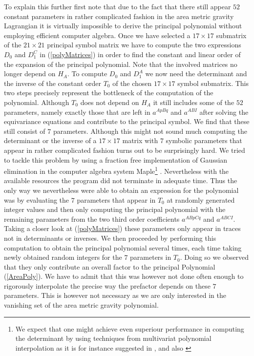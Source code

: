 \documentclass[a4paper,12pt, DIV=14, BCOR=5mm, twoside, headsepline]{scrbook}
\begin{document}
To explain this further first note that due to the fact that there still appear $52$ constant parameters in rather complicated fashion in the area metric gravity Lagrangian it is virtually impossible to derive the principal polynomial without employing efficient computer algebra. Once we have selected a $17 \times 17$ submatrix of the $21 \times 21$ principal symbol matrix we have to compute the two expressions $D_0$ and $D_{1}^C$ in (\ref{polyMatrices}) in order to find the constant and linear order of the expansion of the principal polynomial. Note that the involved matrices no longer depend on $H_A$. To compute $D_0$ and $D_1^A$ we now need the determinant and the inverse of the constant order $T_0$ of the chosen $17 \times 17$ symbol submatrix. This two steps precisely represent the bottleneck of the computation of the polynomial. Although $T_0$ does not depend on $H_A$ it still includes some of the $52$ parameters, namely exactly those that are left in $a^{ApBq}$ and $a^{ABI}$ after solving the equivariance equations and contribute to the principal symbol. We find that these still consist of $7$ parameters. Although this might not sound much computing the determinant or the inverse of a $17 \times 17$ matrix with $7$ symbolic parameters that appear in rather complicated fashion turns out to be surprisingly hard. We tried to tackle this problem by using a fraction free implementation of Gaussian elimination in the computer algebra system Maple\footnote{We expect that one might achieve even superiour performance in computing the determinant by using techniques from multivariat polynomial interpolation as it is for instance suggested in \cite{Qin2018}, \cite{MARCO2004749} and also \cite{articleDet}} \cite{Maple}. Nevertheless with the available resources the program did not terminate in adequate time. Thus the only way we nevertheless were able to obtain an expression for the polynomial was by evaluating the $7$ parameters that appear in $T_0$ at randomly generated integer values and then only computing the principal polynomial with the remaining parameters from the two third order coefficients $a^{ABpCq}$ and $a^{ABCI}$. Taking a closer look at (\ref{polyMatrices}) these parameters only appear in traces not in determinants or inverses. We then proceeded by performing this computation to obtain the principal polynomial several times, each time taking newly obtained random integers for the $7$ parameters in $T_0$. Doing so we observed that they only contribute an overall factor to the principal Polynomial (\ref{AreaPoly}). We have to admit that this was however not done often enough to rigorously interpolate the precise way the prefactor depends on these $7$ parameters. This is however not necessary as we are only interested in the vanishing set of the area metric gravity polynomial. \\
\end{document}

